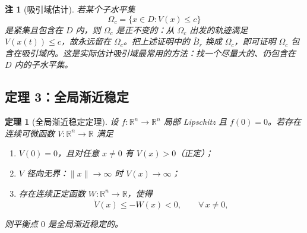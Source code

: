 \documentclass[11pt, a4paper, UTF8, fontset=none]{ctexart}
\theoremstyle{cnthm}
\newtheorem{theorem}{定理}[section]
\newtheorem{remark}{注}[section]
\newcommand{\R}{\mathbb{R}}
\newcommand{\norm}[1]{\lVert #1\rVert}
\begin{document}
\begin{remark}[吸引域估计]
若某个子水平集
\begin{equation}
  \Omega_c=\{x\in D:V(x)\le c\}
\end{equation}
是紧集且包含在 $D$ 内，则 $\Omega_c$ 是正不变的：从 $\Omega_c$ 出发的轨迹满足 $V(x(t))\le c$，故永远留在 $\Omega_c$。把上述证明中的 $\bar B_r$ 换成 $\Omega_c$，即可证明 $\Omega_c$ 包含在吸引域内。这是实际估计吸引域最常用的方法：找一个尽量大的、仍包含在 $D$ 内的子水平集。
\end{remark}

\subsection{定理 3：全局渐近稳定}

\begin{theorem}[全局渐近稳定定理]
\label{thm:global}
设 $f:\R^n\to\R^n$ 局部 Lipschitz 且 $f(0)=0$。若存在连续可微函数 $V:\R^n\to\R$ 满足
\begin{enumerate}[label=(\roman*)]
  \item $V(0)=0$，且对任意 $x\ne0$ 有 $V(x)>0$（正定）；
  \item $V$ 径向无界：$\norm{x}\to\infty$ 时 $V(x)\to\infty$；
  \item 存在连续正定函数 $W:\R^n\to\R$，使得
  \begin{equation}
    \dot V(x)\le -W(x)<0,\qquad \forall\,x\ne0,
    \label{eq:global-condition}
  \end{equation}
\end{enumerate}
则平衡点 $0$ 是全局渐近稳定的。
\end{theorem}
\end{document}
